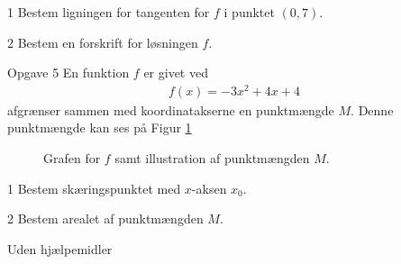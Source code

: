\documentclass[12pt,x11names,a4paper]{article}
\begin{document}
\begin{delopgave}{1}
	Bestem ligningen for tangenten for $f$ i punktet $(0,7)$.
\end{delopgave}
\begin{delopgave}{2}
	Bestem en forskrift for løsningen $f$. 
\end{delopgave}
%
%
%
%
%
\begin{opgavetekst}{Opgave 5}
	En funktion $f$ er givet ved
	\begin{align*}
		f(x) = -3x^2 + 4x + 4
	\end{align*}
	afgrænser sammen med koordinatakserne en punktmængde $M$. Denne punktmængde kan ses på Figur \ref{fig:areal}
	\begin{figure}[H]
		\centering
		\caption{Grafen for $f$ samt illustration af punktmængden $M$.}
		\label{fig:areal}
	\end{figure}
	\phantom{h}
\end{opgavetekst}
\begin{delopgave}{1}
	Bestem skæringspunktet med $x$-aksen $x_0$. 
\end{delopgave}
\begin{delopgave}{2}
	Bestem arealet af punktmængden $M$.
\end{delopgave}
%
%
%
%
%
\newpage
\begin{center}
	\LARGE
	Uden hjælpemidler
\end{center}
\end{document}
